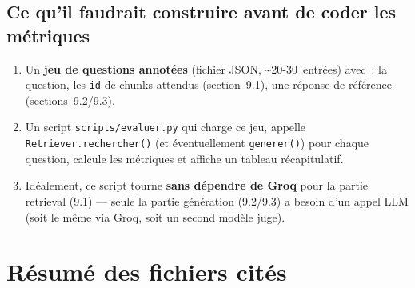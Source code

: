 \documentclass[11pt]{article}
\begin{document}
\subsection{Ce qu'il faudrait construire avant de coder les métriques}

\begin{enumerate}
  \item Un \textbf{jeu de questions annotées} (fichier JSON, \textasciitilde20-30~entrées) avec~:
        la question, les \texttt{id} de chunks attendus (section~9.1), une réponse de référence
        (sections~9.2/9.3).
  \item Un script \texttt{scripts/evaluer.py} qui charge ce jeu, appelle
        \texttt{Retriever.rechercher()} (et éventuellement \texttt{generer()}) pour chaque
        question, calcule les métriques et affiche un tableau récapitulatif.
  \item Idéalement, ce script tourne \textbf{sans dépendre de Groq} pour la partie retrieval
        (9.1) --- seule la partie génération (9.2/9.3) a besoin d'un appel LLM (soit le même via
        Groq, soit un second modèle juge).
\end{enumerate}

\section*{Résumé des fichiers cités}
\end{document}
